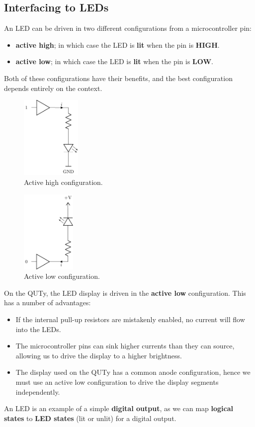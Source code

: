 \documentclass{report}
\begin{document}
\subsection{Interfacing to LEDs}
An LED can be driven in two different configurations from a microcontroller pin:
\begin{itemize}
    \item \textbf{active high}; in which case the LED is \textbf{lit} when the pin is \textbf{HIGH}.
    \item \textbf{active low}; in which case the LED is \textbf{lit} when the pin is \textbf{LOW}.
\end{itemize}
Both of these configurations have their benefits, and the best configuration depends entirely on the context.
\begin{multicols}{2}
    \begin{figure}[H]
        \centering
        \includegraphics[height = 4cm, keepaspectratio = true]{figures/active_high_LED.pdf}
        \caption{Active high configuration.} %
    \end{figure}
    \begin{figure}[H]
        \centering
        \includegraphics[height = 4cm, keepaspectratio = true]{figures/active_low_LED.pdf}
        \caption{Active low configuration.} %
    \end{figure}
\end{multicols}
On the QUTy, the LED display is driven in the \textbf{active low} configuration.
This has a number of advantages:
\begin{itemize}
    \item If the internal pull-up resistors are mistakenly enabled, no current will
          flow into the LEDs.
    \item The microcontroller pins can sink higher currents than they can source,
          allowing us to drive the display to a higher brightness.
    \item The display used on the QUTy has a common anode configuration, hence we must use an
          active low configuration to drive the display segments independently.
\end{itemize}
An LED is an example of a simple \textbf{digital output}, as we can map \textbf{logical states}
to \textbf{LED states} (lit or unlit) for a digital output.
\end{document}
